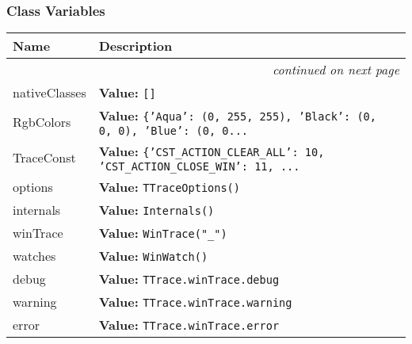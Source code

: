   \subsubsection{Class Variables}

    \vspace{-1cm}
\hspace{\varindent}\begin{longtable}{|p{\varnamewidth}|p{\vardescrwidth}|l}
\cline{1-2}
\cline{1-2} \centering \textbf{Name} & \centering \textbf{Description}& \\
\cline{1-2}
\endhead\cline{1-2}\multicolumn{3}{r}{\small\textit{continued on next page}}\\\endfoot\cline{1-2}
\endlastfoot\raggedright n\-a\-t\-i\-v\-e\-C\-l\-a\-s\-s\-e\-s\- & \raggedright \textbf{Value:} 
{\tt \texttt{[}\texttt{]}}&\\
\cline{1-2}
\raggedright R\-g\-b\-C\-o\-l\-o\-r\-s\- & \raggedright \textbf{Value:} 
{\tt \texttt{\{}\texttt{'}\texttt{Aqua}\texttt{'}\texttt{: }\texttt{(}0\texttt{, }255\texttt{, }255\texttt{)}\texttt{, }\texttt{'}\texttt{Black}\texttt{'}\texttt{: }\texttt{(}0\texttt{, }0\texttt{, }0\texttt{)}\texttt{, }\texttt{'}\texttt{Blue}\texttt{'}\texttt{: }\texttt{(}0\texttt{, }0\texttt{...}}&\\
\cline{1-2}
\raggedright T\-r\-a\-c\-e\-C\-o\-n\-s\-t\- & \raggedright \textbf{Value:} 
{\tt \texttt{\{}\texttt{'}\texttt{CST\_ACTION\_CLEAR\_ALL}\texttt{'}\texttt{: }10\texttt{, }\texttt{'}\texttt{CST\_ACTION\_CLOSE\_WIN}\texttt{'}\texttt{: }11\texttt{, }\texttt{...}}&\\
\cline{1-2}
\raggedright o\-p\-t\-i\-o\-n\-s\- & \raggedright \textbf{Value:} 
{\tt TTraceOptions()}&\\
\cline{1-2}
\raggedright i\-n\-t\-e\-r\-n\-a\-l\-s\- & \raggedright \textbf{Value:} 
{\tt Internals()}&\\
\cline{1-2}
\raggedright w\-i\-n\-T\-r\-a\-c\-e\- & \raggedright \textbf{Value:} 
{\tt WinTrace("\_")}&\\
\cline{1-2}
\raggedright w\-a\-t\-c\-h\-e\-s\- & \raggedright \textbf{Value:} 
{\tt WinWatch()}&\\
\cline{1-2}
\raggedright d\-e\-b\-u\-g\- & \raggedright \textbf{Value:} 
{\tt TTrace.winTrace.debug}&\\
\cline{1-2}
\raggedright w\-a\-r\-n\-i\-n\-g\- & \raggedright \textbf{Value:} 
{\tt TTrace.winTrace.warning}&\\
\cline{1-2}
\raggedright e\-r\-r\-o\-r\- & \raggedright \textbf{Value:} 
{\tt TTrace.winTrace.error}&\\
\cline{1-2}
\end{longtable}

